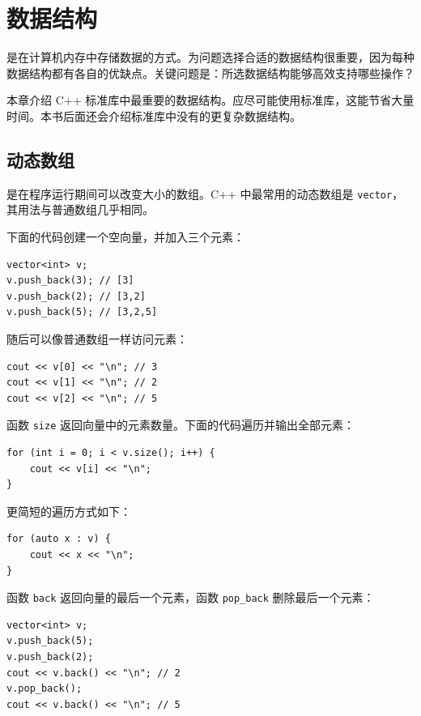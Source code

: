 \chapter{数据结构}


是在计算机内存中存储数据的方式。为问题选择合适的数据结构很重要，因为每种数据结构都有各自的优缺点。关键问题是：所选数据结构能够高效支持哪些操作？

本章介绍 C++ 标准库中最重要的数据结构。应尽可能使用标准库，这能节省大量时间。本书后面还会介绍标准库中没有的更复杂数据结构。

\section{动态数组}


是在程序运行期间可以改变大小的数组。C++ 中最常用的动态数组是 \texttt{vector}，其用法与普通数组几乎相同。

下面的代码创建一个空向量，并加入三个元素：

\begin{lstlisting}
vector<int> v;
v.push_back(3); // [3]
v.push_back(2); // [3,2]
v.push_back(5); // [3,2,5]
\end{lstlisting}

随后可以像普通数组一样访问元素：

\begin{lstlisting}
cout << v[0] << "\n"; // 3
cout << v[1] << "\n"; // 2
cout << v[2] << "\n"; // 5
\end{lstlisting}

函数 \texttt{size} 返回向量中的元素数量。下面的代码遍历并输出全部元素：

\begin{lstlisting}
for (int i = 0; i < v.size(); i++) {
    cout << v[i] << "\n";
}
\end{lstlisting}

\begin{samepage}
更简短的遍历方式如下：

\begin{lstlisting}
for (auto x : v) {
    cout << x << "\n";
}
\end{lstlisting}
\end{samepage}

函数 \texttt{back} 返回向量的最后一个元素，函数 \texttt{pop\_back} 删除最后一个元素：

\begin{lstlisting}
vector<int> v;
v.push_back(5);
v.push_back(2);
cout << v.back() << "\n"; // 2
v.pop_back();
cout << v.back() << "\n"; // 5
\end{lstlisting}

